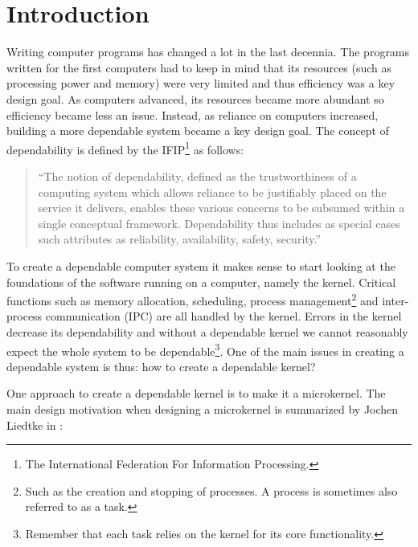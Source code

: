 \hypertarget{introduction}{\chapter{Introduction}}

\begin{epigraphs}
\end{epigraphs}

Writing computer programs has changed a lot in the last decennia. The programs written for the first computers had to keep in mind that its resources (such as processing power and memory) were very limited and thus efficiency was a key design goal. As computers advanced, its resources became more abundant so efficiency became less an issue. Instead, as reliance on computers increased, building a more dependable system became a key design goal. The concept of dependability is defined by the IFIP\footnote{The International Federation For Information Processing.} \cite{ifipdepen05} as follows:

\begin{quote}``The notion of dependability, defined as the trustworthiness of a computing system which allows reliance to be justifiably placed on the service it delivers, enables these various concerns to be subsumed within a single conceptual framework. Dependability thus includes as special cases such attributes as reliability, availability, safety, security.''
\end{quote}

To create a dependable computer system it makes sense to start looking at the foundations of the software running on a computer, namely the kernel. Critical functions such as memory allocation, scheduling, process management\footnote{Such as the creation and stopping of processes. A process is sometimes also referred to as a task.} and inter-process communication (IPC) are all handled by the kernel. Errors in the kernel decrease its dependability and without a dependable kernel we cannot reasonably expect the whole system to be dependable\footnote{Remember that each task relies on the kernel for its core functionality.}. One of the main issues in creating a dependable system is thus: how to create a dependable kernel?\emptyline

One approach to create a dependable kernel is to make it a microkernel. The main design motivation when designing a microkernel is summarized by Jochen Liedtke in \cite{liedtke95kernel}:

